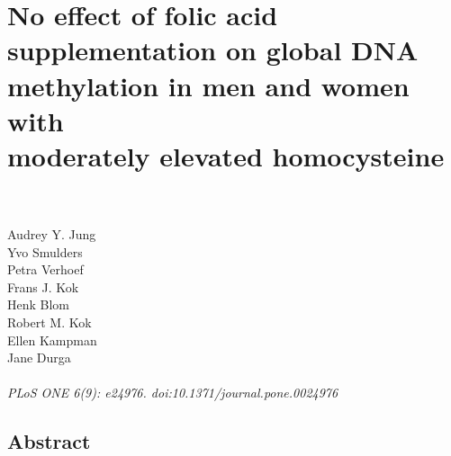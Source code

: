 \chapter[No effect of folic acid supplementation on global DNA methylation in men and women with moderately elevated homocysteine]{No effect of folic acid supplementation on global DNA methylation in men and women with \\ moderately elevated homocysteine}
\label{chap4_FACIT} 

\quad\\

\quad\\
\noindent
Audrey Y. Jung\\ 
Yvo Smulders\\ 
Petra Verhoef\\ 
Frans J. Kok\\ 
Henk Blom\\ 
Robert M. Kok\\ 
Ellen Kampman\\ 
Jane Durga\\ 

\quad\\

\noindent
\emph{PLoS ONE 6(9): e24976. doi:10.1371/journal.pone.0024976}

\newpage 

\section*{Abstract}

